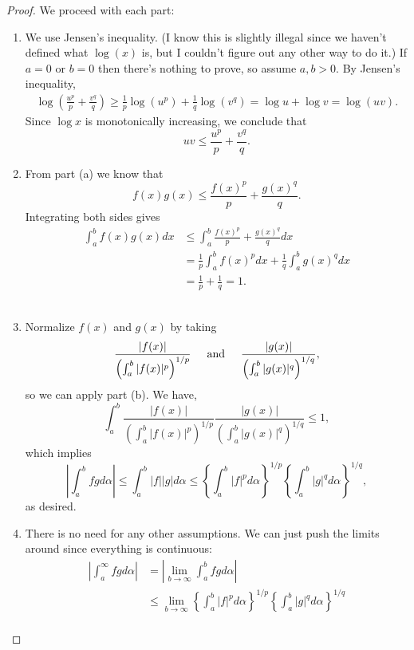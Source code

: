 \documentclass[12pt]{article}
\theoremstyle{remark}
\theoremstyle{named}
\renewcommand{\a}{\alpha}
\newcommand{\abs}[1]{|#1|}
\newcommand{\bigabs}[1]{\left|#1\right|}
\begin{document}
\begin{proof}
    We proceed with each part:
    \begin{enumerate}
        \item We use Jensen's inequality. (I know this is slightly illegal since we haven't defined what \(\log(x)\) is, but I couldn't figure out any other way to do it.)
        If \(a = 0\) or \(b = 0\) then there's nothing to prove, so assume \(a, b > 0\). By Jensen's inequality,
        \begin{align*}
            \log\left(\frac{u^p}{p} + \frac{v^q}{q}\right) \ge \frac 1 p \log (u^p) + \frac 1 q \log(v^q) = \log u + \log v = \log(uv).
        \end{align*}
        Since \(\log x\) is monotonically increasing, we conclude that \[uv \le \frac{u^p}{p} + \frac{v^q}{q}.\]
        \item From part (a) we know that \[f(x)g(x) \le \frac{f(x)^p}{p} + \frac{g(x)^q}{q}.\]
        Integrating both sides gives
        \begin{align*}
            \int_a^b f(x)g(x) dx &\le \int_a^b \frac{f(x)^p}{p} + \frac{g(x)^q}{q} dx \\
            &= \frac 1 p \int_a^b f(x)^p dx + \frac 1 q \int_a^b g(x)^q dx \\
            &= \frac{1}{p} + \frac 1 q = 1.
        \end{align*}\
        \item Normalize \(f(x)\) and \(g(x)\) by taking 
        \[\frac{\abs{f(x)}}{\left(\int_a^b \abs{f(x)}^p\right)^{1/p}} \hspace*{5mm} \text{and} \hspace*{5mm} \frac{\abs{g(x)}}{\left(\int_a^b \abs{g(x)}^q\right)^{1/q}},\]
        so we can apply part (b). We have,
        \[\int_a^b\frac{\abs{f(x)}}{\left(\int_a^b \abs{f(x)}^p\right)^{1/p}}\frac{\abs{g(x)}}{\left(\int_a^b \abs{g(x)}^q\right)^{1/q}} \le 1,\]
        which implies 
        \[\bigabs{\int_a^b fg d \a} \le \int_a^b \abs{f}\abs{g} d \a \le \left\{\int_a^b \abs{f}^p d\a\right\}^{1/p} \left\{\int_a^b \abs{g}^q d\a\right\}^{1/q},\]
        as desired.
        \item There is no need for any other assumptions. We can just push the limits around since everything is continuous:
        \begin{align*}
            \bigabs{\int_a^\infty fg d \a} &= \bigabs{\lim_{b \to \infty}\int_a^b fg d \a} \\
            &\le \lim_{b \to \infty}\left\{\int_a^b \abs{f}^p d\a\right\}^{1/p} \left\{\int_a^b \abs{g}^q d\a\right\}^{1/q} \\

\end{align*}
\end{enumerate}
\end{proof}
\end{document}
